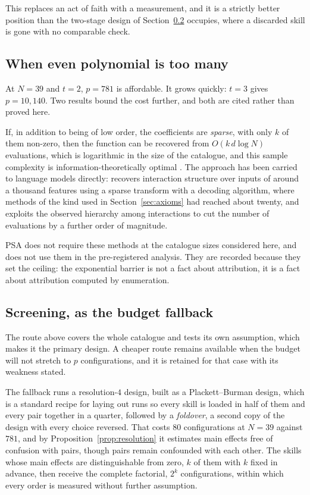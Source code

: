 \documentclass[11pt]{article}
\theoremstyle{plain}
\theoremstyle{definition}
\theoremstyle{remark}
\begin{document}
This replaces an act of faith with a measurement, and it is a strictly better position than the two-stage design of Section~\ref{sec:screen} occupies, where a discarded skill is gone with no comparable check.

\subsection{When even polynomial is too many}

At $N = 39$ and $t = 2$, $p = 781$ is affordable. It grows quickly: $t = 3$ gives $p = 10{,}140$. Two results bound the cost further, and both are cited rather than proved here.

If, in addition to being of low order, the coefficients are \emph{sparse}, with only $k$ of them non-zero, then the function can be recovered from $O(k\,d \log N)$ evaluations, which is logarithmic in the size of the catalogue, and this sample complexity is information-theoretically optimal \cite{amrollahi}. The approach has been carried to language models directly: \cite{spex} recovers interaction structure over inputs of around a thousand features using a sparse transform with a decoding algorithm, where methods of the kind used in Section~\ref{sec:axioms} had reached about twenty, and \cite{proxyspex} exploits the observed hierarchy among interactions to cut the number of evaluations by a further order of magnitude.

PSA does not require these methods at the catalogue sizes considered here, and does not use them in the pre-registered analysis. They are recorded because they set the ceiling: the exponential barrier is not a fact about attribution, it is a fact about attribution computed by enumeration.

\subsection{Screening, as the budget fallback}
\label{sec:screen}

The route above covers the whole catalogue and tests its own assumption, which makes it the primary design. A cheaper route remains available when the budget will not stretch to $p$ configurations, and it is retained for that case with its weakness stated.

The fallback runs a resolution-$4$ design, built as a Plackett--Burman design, which is a standard recipe for laying out runs so every skill is loaded in half of them and every pair together in a quarter, followed by a \emph{foldover}, a second copy of the design with every choice reversed. That costs $80$ configurations at $N = 39$ against $781$, and by Proposition~\ref{prop:resolution} it estimates main effects free of confusion with pairs, though pairs remain confounded with each other. The skills whose main effects are distinguishable from zero, $k$ of them with $k$ fixed in advance, then receive the complete factorial, $2^k$ configurations, within which every order is measured without further assumption.
\end{document}
